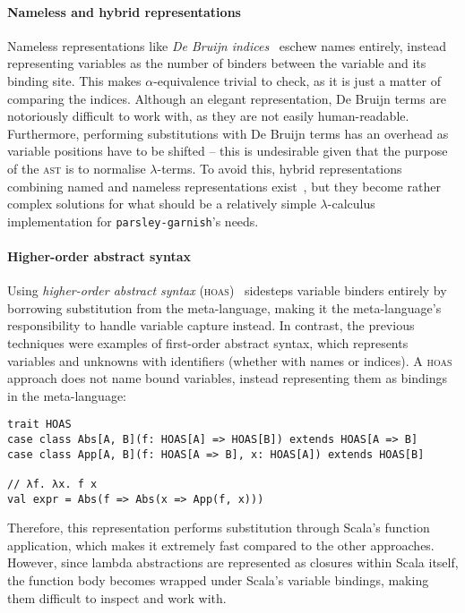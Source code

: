 \documentclass[../../../main.tex]{subfiles}
\begin{document}
\paragraph{Nameless and hybrid representations}
Nameless representations like \emph{De Bruijn indices}~\cite{debruijn_lambda_1972} eschew names entirely, instead representing variables as the number of binders between the variable and its binding site.
This makes $\alpha$-equivalence trivial to check, as it is just a matter of comparing the indices.
Although an elegant representation, De Bruijn terms are notoriously difficult to work with, as they are not easily human-readable.
Furthermore, performing substitutions with De Bruijn terms has an overhead as variable positions have to be shifted -- this is undesirable given that the purpose of the \textsc{ast} is to normalise $\lambda$-terms.
To avoid this, hybrid representations combining named and nameless representations exist~\cite{mcbride_imnotanumber_2004,chargueraud_locally_2012}, but they become rather complex solutions for what should be a relatively simple $\lambda$-calculus implementation for \texttt{parsley-garnish}'s needs.

\paragraph{Higher-order abstract syntax}
Using \emph{higher-order abstract syntax} (\textsc{hoas})~\cite{pfenning_hoas_1988} sidesteps variable binders entirely by borrowing substitution from the meta-language, making it the meta-language's responsibility to handle variable capture instead.
In contrast, the previous techniques were examples of first-order abstract syntax, which represents variables and unknowns with identifiers (whether with names or indices).
A \textsc{hoas} approach does not name bound variables, instead representing them as bindings in the meta-language:

\begin{verbatim}
trait HOAS
case class Abs[A, B](f: HOAS[A] => HOAS[B]) extends HOAS[A => B]
case class App[A, B](f: HOAS[A => B], x: HOAS[A]) extends HOAS[B]

// λf. λx. f x
val expr = Abs(f => Abs(x => App(f, x)))
\end{verbatim}
%
Therefore, this representation performs substitution through Scala's function application, which makes it extremely fast compared to the other approaches.
However, since lambda abstractions are represented as closures within Scala itself, the function body becomes wrapped under Scala's variable bindings, making them difficult to inspect and work with.
\end{document}
